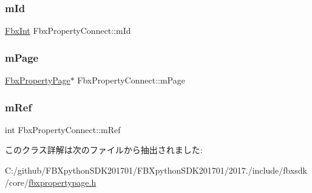 \mbox{\label{class_fbx_property_connect_abce4165e9ad7ed40341d8988763f083c}} 
\subsubsection{\texorpdfstring{m\+Id}{mId}}
{\footnotesize\ttfamily \hyperlink{fbxtypes_8h_a088fa96de3b0b3ea69f0f6afef525dfb}{Fbx\+Int} Fbx\+Property\+Connect\+::m\+Id}

\mbox{\label{class_fbx_property_connect_a08654feca214b0f552c333115c6264fe}} 
\subsubsection{\texorpdfstring{m\+Page}{mPage}}
{\footnotesize\ttfamily \hyperlink{class_fbx_property_page}{Fbx\+Property\+Page}$\ast$ Fbx\+Property\+Connect\+::m\+Page}

\mbox{\label{class_fbx_property_connect_a4bc3cc9dabbd6ffb4e25ab37b84f80b4}} 
\subsubsection{\texorpdfstring{m\+Ref}{mRef}}
{\footnotesize\ttfamily int Fbx\+Property\+Connect\+::m\+Ref}



このクラス詳解は次のファイルから抽出されました\+:\begin{DoxyCompactItemize}
\item 
C\+:/github/\+F\+B\+Xpython\+S\+D\+K201701/\+F\+B\+Xpython\+S\+D\+K201701/2017./include/fbxsdk/core/\hyperlink{fbxpropertypage_8h}{fbxpropertypage.\+h}\end{DoxyCompactItemize}
